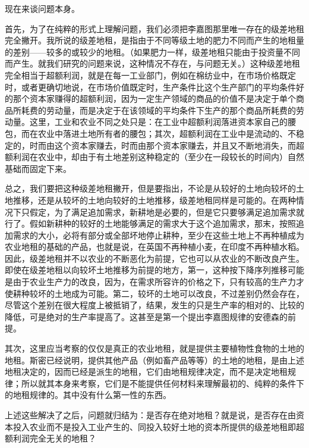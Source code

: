 现在来谈问题本身。

首先，为了在纯粹的形式上理解问题，我们必须把李嘉图那里唯一存在的级差地租完全撇开。我所说的级差地租，是指由于不同等级土地的肥力不同而产生的地租量的差别——较多的或较少的地租。（如果肥力一样，级差地租只能由于投资量不同而产生。就我们研究的问题来说，这种情况不存在，与问题无关。）这种级差地租完全相当于超额利润，就是在每一工业部门，例如在棉纺业中，在市场价格既定时，或者更确切地说，在市场价值既定时，生产条件比这个生产部门的平均条件好的那个资本家赚得的超额利润，因为一定生产领域的商品的价值不是决定于单个商品所耗费的劳动量，而是决定于在该领域的平均条件下生产的那个商品所耗费的劳动量。这里，工业和农业不同之处只是：在工业中超额利润落进资本家自己的腰包，而在农业中落进土地所有者的腰包；其次，超额利润在工业中是流动的、不稳定的，时而由这个资本家赚去，时而由那个资本家赚去，并且又不断地消失，而超额利润在农业中，却由于有土地差别这种稳定的（至少在一段较长的时间内）自然基础而固定下来。

总之，我们要把这种级差地租撇开，但是要指出，不论是从较好的土地向较坏的土地推移，还是从较坏的土地向较好的土地推移，级差地租同样是可能的。在两种情况下只假定，为了满足追加需求，新耕地是必要的，但是它只要够满足追加需求就行了。假如新耕种的较好的土地能够满足的需求大于这个追加需求，那末，按照追加需求的大小，必将有部分或全部坏地停止耕种，至少在这些土地上不再种植成为农业地租的基础的产品，也就是说，在英国不再种植小麦，在印度不再种植水稻。因此，级差地租并不以农业的不断恶化为前提，它也可以从农业的不断改良产生。即使在级差地租以向较坏土地推移为前提的地方，第一，这种按下降序列推移可能是由于农业生产力的改良，因为，在需求所容许的价格之下，只有较高的生产力才使耕种较坏的土地成为可能。第二，较坏的土地可以改良，不过差别仍然会存在，尽管这个差别在很大程度上被抵销了，结果，发生的只是生产率的相对的、比较的降低，可是绝对的生产率提高了。这甚至是第一个提出李嘉图规律的安德森的前提。

其次，这里应当考察的仅仅是真正的农业地租，就是提供主要植物性食物的土地的地租。斯密已经说明，提供其他产品（例如畜产品等等）的土地的地租，是由上述地租决定的，因而已经是派生的地租，它们由地租规律决定，而不是决定地租规律；所以就其本身来考察，它们是不能提供任何材料来理解最初的、纯粹的条件下的地租规律的。其中没有什么第一性的东西。

上述这些解决了之后，问题就归结为：是否存在绝对地租？就是说，是否存在由资本投入农业而不是投入工业产生的、同投入较好土地的资本所提供的级差地租即超额利润完全无关的地租？

